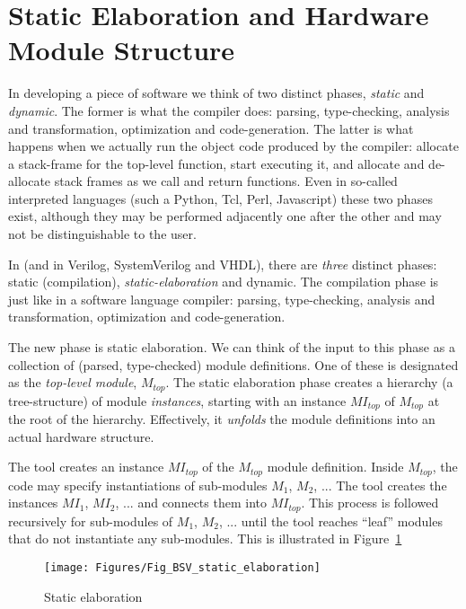
\section{Static Elaboration and Hardware Module Structure}

\label{Sec_Static_Elaboration}


In developing a piece of software we think of two distinct phases,
\emph{static} and \emph{dynamic}.  The former is what the compiler
does: parsing, type-checking, analysis and transformation,
optimization and code-generation.  The latter is what happens when we
actually run the object code produced by the compiler: allocate a
stack-frame for the top-level function, start executing it, and
allocate and de-allocate stack frames as we call and return functions.
Even in so-called interpreted languages (such a Python, Tcl, Perl,
Javascript) these two phases exist, although they may be performed
adjacently one after the other and may not be distinguishable to the
user.

In {\BSV} (and in Verilog, SystemVerilog and VHDL), there are
\emph{three} distinct phases: static (compilation),
\emph{static-elaboration} and dynamic.  The compilation phase is just
like in a software language compiler: parsing, type-checking, analysis
and transformation, optimization and code-generation.

The new phase is static elaboration.  We can think of the input to
this phase as a collection of (parsed, type-checked) module
definitions.  One of these is designated as the \emph{top-level
module}, $M_{top}$.  The static elaboration phase creates a hierarchy
(a tree-structure) of module \emph{instances}, starting with an
instance $MI_{top}$ of $M_{top}$ at the root of the hierarchy.
Effectively, it \emph{unfolds} the module definitions into an actual
hardware structure.

The tool creates an instance $MI_{top}$ of the $M_{top}$ module
definition. Inside $M_{top}$, the code may specify instantiations of
sub-modules $M_1$, $M_2$, ...  The tool creates the instances $MI_1$,
$MI_2$, ...  and connects them into $MI_{top}$.  This process is
followed recursively for sub-modules of $M_1$, $M_2$, ... until the
tool reaches ``leaf'' modules that do not instantiate any sub-modules.
This is illustrated in Figure~\ref{Fig_BSV_static_elaboration}
\begin{figure}[htbp]
  \centerline{\texttt{[image: Figures/Fig\_BSV\_static\_elaboration]}}
  \caption{\label{Fig_BSV_static_elaboration} Static elaboration}
\end{figure}


